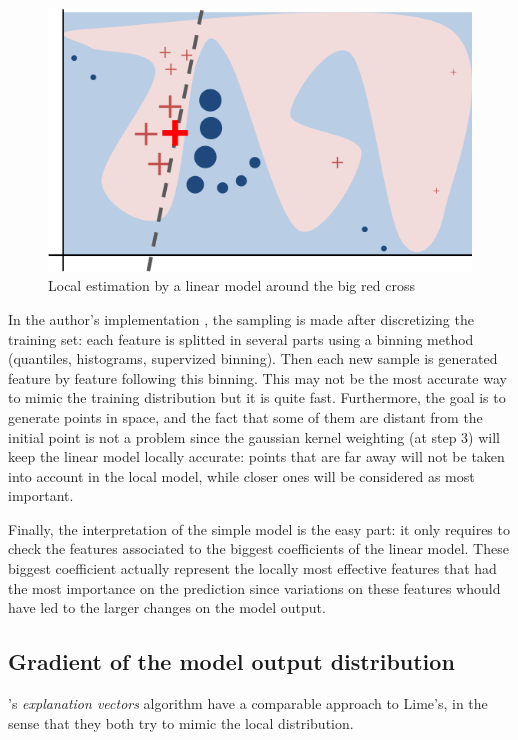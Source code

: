 \documentclass[a4paper,11pt]{kth-mag}
\begin{document}
\begin{figure}[!h]
	\centering
   	\def\svgwidth{\columnwidth}
	\includegraphics{lime-schema.png}
    \caption{Local estimation by a linear model around the big red cross}
\end{figure}

In the author's implementation \cite{limeGitHub}, the sampling is made after discretizing the training set: each feature is splitted in several parts using a binning method (quantiles, histograms, supervized binning). Then each new sample is generated feature by feature following this binning. This may not be the most accurate way to mimic the training distribution but it is quite fast. Furthermore, the goal is to generate points in space, and the fact that some of them are distant from the initial point is not a problem since the gaussian kernel weighting (at step 3) will keep the linear model locally accurate: points that are far away will not be taken into account in the local model, while closer ones will be considered as most important.

Finally, the interpretation of the simple model is the easy part: it only requires to check the features associated to the biggest coefficients of the linear model. These biggest coefficient actually represent the locally most effective features that had the most importance on the prediction since variations on these features whould have led to the larger changes on the model output.

\subsection{Gradient of the model output distribution}

\citeauthor{explvect}'s \textit{explanation vectors} algorithm \cite{explvect} have a comparable approach to Lime's, in the sense that they both try to mimic the local distribution.
\end{document}
